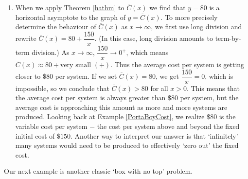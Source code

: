 {\begin{enumerate}
\item  When we apply Theorem \ref{hathm} to $\overline{C}(x)$ we find that $y=80$ is a horizontal asymptote to the graph of $y=\overline{C}(x)$.  To more precisely determine the behaviour of $\overline{C}(x)$ as $x \rightarrow \infty$, we first use long division  and rewrite $\overline{C}(x) = 80+\dfrac{150}{x}$. (In this case, long division amounts to term-by-term division.) As $x \rightarrow \infty$, $\dfrac{150}{x} \rightarrow 0^{+}$, which means $\overline{C}(x) \approx 80 + \mbox{very small $(+)$}$.  Thus the average cost per system is getting closer to $\$ 80$ per system.  If we set $\overline{C}(x) = 80$, we get $\dfrac{150}{x} = 0$, which is impossible, so we conclude that $\overline{C}(x) > 80$ for all $x > 0$.  This means that the average cost per system is always greater than $\$ 80$ per system, but the average cost is approaching this amount as more and more systems are produced.  Looking back at Example \ref{PortaBoyCost}, we realize $\$ 80$ is the variable cost per system $-$ the cost per system above and beyond the fixed initial cost of $\$150$.  Another way to interpret our answer is that `infinitely' many systems would need to be produced to effectively `zero out'  the fixed cost. 

\end{enumerate}
}

\medskip

Our next example is another classic `box with no top' problem.

\medskip

